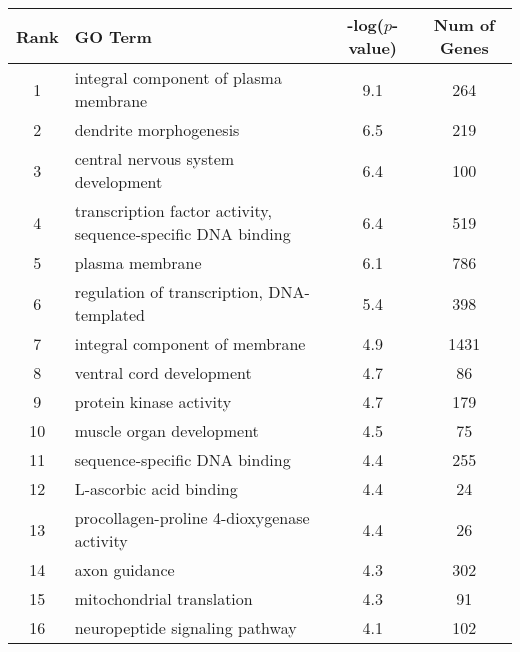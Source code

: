 \centering \begin{tabular}{c|p{4in}|c|c}
Rank	&GO Term	&-log($p$-value)	&Num of Genes\\\hline
1	&integral component of plasma membrane	&9.1	&264\\
2	&dendrite morphogenesis	&6.5	&219\\
3	&central nervous system development	&6.4	&100\\
4	&transcription factor activity, sequence-specific DNA binding	&6.4	&519\\
5	&plasma membrane	&6.1	&786\\
6	&regulation of transcription, DNA-templated	&5.4	&398\\
7	&integral component of membrane	&4.9	&1431\\
8	&ventral cord development	&4.7	&86\\
9	&protein kinase activity	&4.7	&179\\
10	&muscle organ development	&4.5	&75\\
11	&sequence-specific DNA binding	&4.4	&255\\
12	&L-ascorbic acid binding	&4.4	&24\\
13	&procollagen-proline 4-dioxygenase activity	&4.4	&26\\
14	&axon guidance	&4.3	&302\\
15	&mitochondrial translation	&4.3	&91\\
16	&neuropeptide signaling pathway	&4.1	&102\\
\end{tabular}

